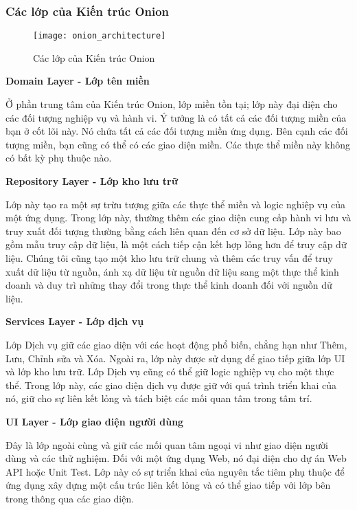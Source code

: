 \subsubsection{Các lớp của Kiến trúc Onion}

\begin{figure}[H]
	\centering
	\texttt{[image: onion\_architecture]}
	\caption{Các lớp của Kiến trúc Onion}
\end{figure}

\textbf{Domain Layer - Lớp tên miền}

Ở phần trung tâm của Kiến trúc Onion, lớp miền tồn tại; lớp này đại diện cho các đối tượng nghiệp vụ và hành vi. Ý tưởng là có tất cả các đối tượng miền của bạn ở cốt lõi này. Nó chứa tất cả các đối tượng miền ứng dụng. Bên cạnh các đối tượng miền, bạn cũng có thể có các giao diện miền. Các thực thể miền này không có bất kỳ phụ thuộc nào.

\textbf{Repository Layer - Lớp kho lưu trữ}

Lớp này tạo ra một sự trừu tượng giữa các thực thể miền và logic nghiệp vụ của một ứng dụng. Trong lớp này, thường thêm các giao diện cung cấp hành vi lưu và truy xuất đối tượng thường bằng cách liên quan đến cơ sở dữ liệu. Lớp này bao gồm mẫu truy cập dữ liệu, là một cách tiếp cận kết hợp lỏng hơn để truy cập dữ liệu. Chúng tôi cũng tạo một kho lưu trữ chung và thêm các truy vấn để truy xuất dữ liệu từ nguồn, ánh xạ dữ liệu từ nguồn dữ liệu sang một thực thể kinh doanh và duy trì những thay đổi trong thực thể kinh doanh đối với nguồn dữ liệu.

\textbf{Services Layer - Lớp dịch vụ}

Lớp Dịch vụ giữ các giao diện với các hoạt động phổ biến, chẳng hạn như Thêm, Lưu, Chỉnh sửa và Xóa. Ngoài ra, lớp này được sử dụng để giao tiếp giữa lớp UI và lớp kho lưu trữ. Lớp Dịch vụ cũng có thể giữ logic nghiệp vụ cho một thực thể. Trong lớp này, các giao diện dịch vụ được giữ với quá trình triển khai của nó, giữ cho sự liên kết lỏng và tách biệt các mối quan tâm trong tâm trí.

\textbf{UI Layer - Lớp giao diện người dùng}

Đây là lớp ngoài cùng và giữ các mối quan tâm ngoại vi như giao diện người dùng và các thử nghiệm. Đối với một ứng dụng Web, nó đại diện cho dự án Web API hoặc Unit Test. Lớp này có sự triển khai của nguyên tắc tiêm phụ thuộc để ứng dụng xây dựng một cấu trúc liên kết lỏng và có thể giao tiếp với lớp bên trong thông qua các giao diện.

